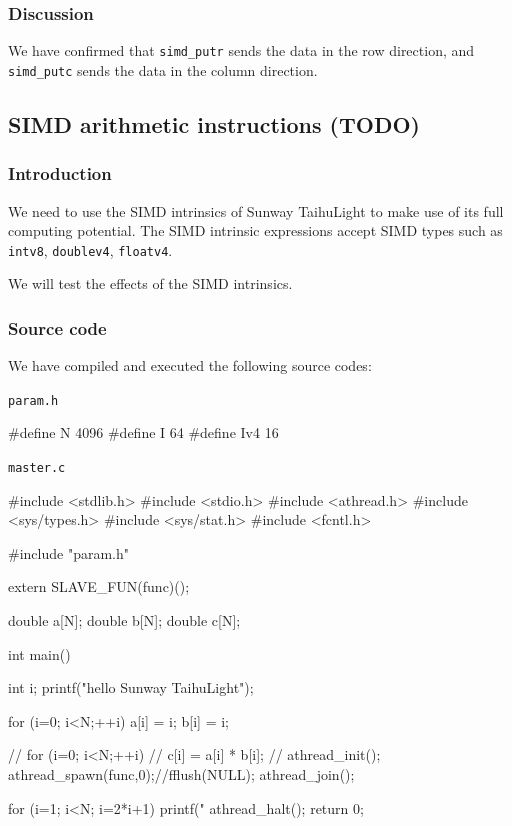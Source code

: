 \subsubsection{Discussion}

We have confirmed that
\verb`simd_putr` sends the data in the row direction, and
\verb`simd_putc` sends the data in the column direction.


\subsection{SIMD arithmetic instructions (TODO)}
\subsubsection{Introduction}

We need to use the SIMD intrinsics of Sunway TaihuLight to make use of its full computing potential.
The SIMD intrinsic expressions accept SIMD types such as
\verb`intv8`,
\verb`doublev4`,
\verb`floatv4`.


We will test the effects of the SIMD intrinsics.


\subsubsection{Source code}
 We have compiled and executed the following source codes:

\verb`param.h`
\begin{code}
#define N 4096
#define I 64
#define Iv4 16

\end{code}

\verb`master.c`
\begin{code}
#include <stdlib.h>
#include <stdio.h>
#include <athread.h>
#include <sys/types.h>
#include <sys/stat.h>
#include <fcntl.h>

#include "param.h"

extern SLAVE_FUN(func)();

double a[N];
double b[N];
double c[N];

int main() {
  int i;
  printf("hello Sunway TaihuLight\n");

  for (i=0; i<N;++i){
    a[i] = i;
    b[i] = i;
  }

  // for (i=0; i<N;++i){
  //   c[i] = a[i] * b[i];
  // }
  athread_init();
  athread_spawn(func,0);//fflush(NULL);
  athread_join();

  for (i=1; i<N; i=2*i+1){
    printf("%
  }
  athread_halt();
  return 0;
}

\end{code}

